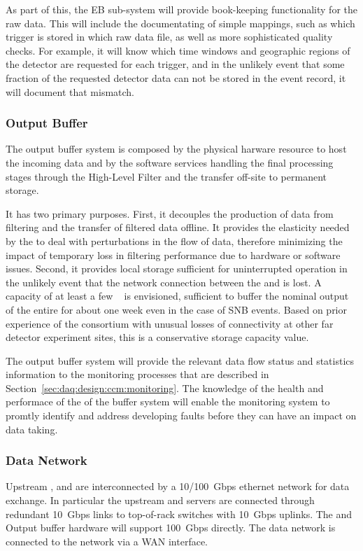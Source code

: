 
As part of this, the EB sub-system will provide book-keeping functionality for the raw data.  This will include the documentating of simple mappings, such as which trigger is stored in which raw data file, as well as more sophisticated quality checks. For example, it will know which time windows and geographic regions of the detector are requested for each trigger, and in the unlikely event that some fraction of the requested detector data can not be stored in the event record, it will document that mismatch.

\subsubsection{Output Buffer}

The output buffer system is composed by the physical harware resource to host the incoming data and by the software services handling the final processing stages through the High-Level Filter and the transfer off-site to permanent storage.

It has two primary purposes.  First, it decouples the production of data from filtering and the
transfer of filtered data offline. It provides the elasticity needed by the  to deal with
perturbations in the flow of data, therefore minimizing the impact of temporary loss in filtering
performance due to hardware or software issues. Second, it provides local storage sufficient for
uninterrupted  operation in the unlikely event that the network connection between the
 and \fnal is lost.  A capacity of at least a few \si{\peta\byte} is envisioned,
sufficient to buffer the nominal output of the entire  for about one week even in the case of SNB events. Based on prior experience of the consortium with unusual losses of  connectivity at
other far detector experiment sites, this is a conservative storage capacity value.

The output buffer system will provide the relevant data flow status and statistics information to the monitoring processes that are described in Section~\ref{sec:daq:design:ccm:monitoring}. The knowledge of the health and performace of the of the buffer system will enable the monitoring system to promtly identify and address developing faults before they can have an impact on data taking.


\subsubsection{Data Network}
Upstream ,  and   are interconnected by a \SI{10/100}{ Gbps} ethernet network for data exchange.
In particular the upstream  and  servers are connected through redundant \SI{10}{ Gbps} links to top-of-rack switches with \SI{10}{Gbps} uplinks.
The  and Output buffer hardware will support \SI{100}{Gbps} directly.
The  data network is connected to the \fnal network via a WAN interface.

